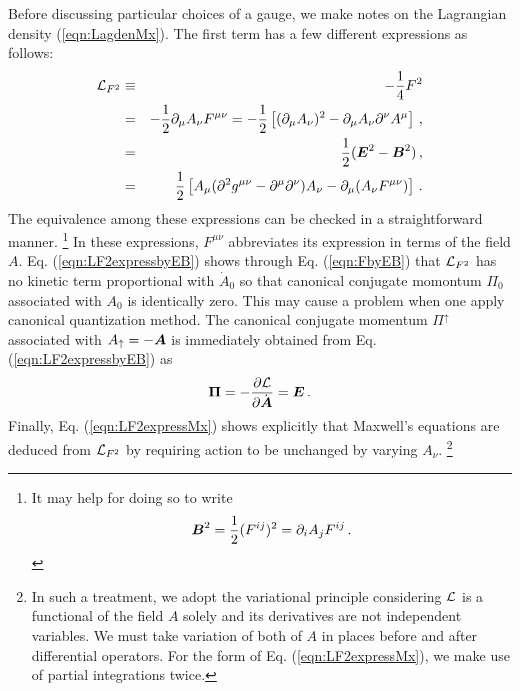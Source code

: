 Before discussing particular choices of a gauge, 
we make notes on the Lagrangian density (\ref{eqn:LagdenMx}).
The first term has a few different expressions as follows:
\begin{eqnarray}
{\cal L}_{F^2} 
&\equiv&
 - \frac{1}{4} F^2
\nonumber\\
&=&
- \frac{1}{2} \partial_\mu A_\nu F^{\mu \nu}
=
- \frac{1}{2}
\left[
(\partial_\mu A_\nu)^2 
- \partial_\mu A_\nu \partial^\nu A^\mu
\right] \,,
\label{eqn:LF2expressbyA}
\\
&=&
\frac{1}{2}
( \mbox{\boldmath $E$}^2 - \mbox{\boldmath $B$}^2 ) \,,
\label{eqn:LF2expressbyEB}
\\
&=&
\frac{1}{2}
\left[
A_\mu 
(\partial^2 g^{\mu \nu} - \partial^\mu \partial^\nu) A_\nu
-
\partial_\mu (A_\nu F^{\mu \nu})
\right] \,.
\label{eqn:LF2expressMx}
\end{eqnarray}
The equivalence among these expressions
can be checked in a straightforward manner.
 \footnote{%
It may help for doing so to write
\begin{eqnarray}
\mbox{\boldmath $B$}^2 = \frac{1}{2} (F^{ij})^2 = \partial_i A_j F^{ij} \,.
\end{eqnarray}
}%
In these expressions, $F^{\mu \nu}$ abbreviates its expression in terms of the field $A$.
Eq. (\ref{eqn:LF2expressbyEB})
shows through Eq. (\ref{eqn:FbyEB})
that ${\cal L}_{F^2}$
has no kinetic term proportional with $\dot{A}_0$ 
so that canonical conjugate
momontum $\Pi_0$ associated with $A_0$ is identically zero.
This may cause a problem when one apply canonical quantization method.
The canonical conjugate momentum $\Pi^{\uparrow}$ associated with $A_{\uparrow} = -\mbox{\boldmath $A$}$ is 
immediately obtained
from Eq. (\ref{eqn:LF2expressbyEB}) as
\begin{eqnarray}
\mbox{\boldmath $\Pi$} = 
- \frac{\partial {\cal L}}{\partial \dot{\mbox{\boldmath $A$}}}
=
\mbox{\boldmath $E$} \,.
\end{eqnarray}
Finally, Eq. (\ref{eqn:LF2expressMx}) shows explicitly that Maxwell's equations are
deduced from ${\cal L}_{F^2}$ by requiring action to be unchanged by
varying $A_\nu$.
\footnote{%
In such a treatment, we adopt the variational principle considering ${\cal L}$ is 
a functional of the field $A$ solely and its derivatives are not independent variables.
We must take variation of both of $A$ in places before and after differential operators. 
For the form of Eq. (\ref{eqn:LF2expressMx}), we make use of partial integrations twice.
}%

